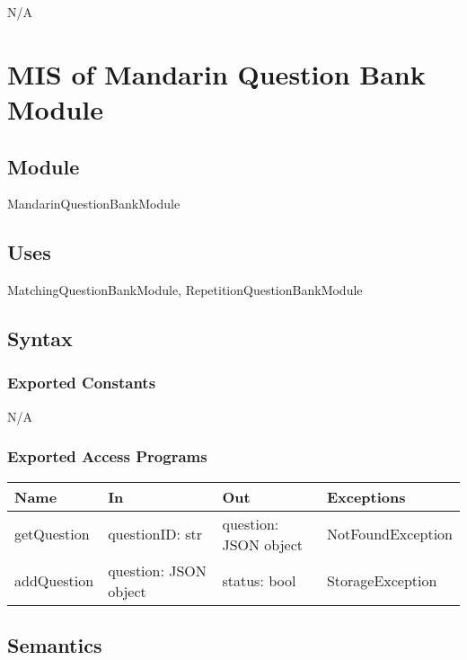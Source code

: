 \documentclass[12pt, titlepage]{article}
\begin{document}
N/A
\section{MIS of Mandarin Question Bank Module} \label{MandarinQuestionBankModule}

\subsection{Module}

MandarinQuestionBankModule

\subsection{Uses}

MatchingQuestionBankModule, RepetitionQuestionBankModule

\subsection{Syntax}

\subsubsection{Exported Constants}

N/A

\subsubsection{Exported Access Programs}

\begin{center}
\begin{tabular}{p{3cm} p{4cm} p{4cm} p{5cm}}
\hline
\textbf{Name} & \textbf{In} & \textbf{Out} & \textbf{Exceptions} \\
\hline
getQuestion & \raggedright\arraybackslash questionID: str & \raggedright\arraybackslash question: JSON object & \raggedright\arraybackslash NotFoundException \\
\hline
addQuestion & \raggedright\arraybackslash question: JSON object & \raggedright\arraybackslash status: bool & \raggedright\arraybackslash StorageException \\
\hline
\end{tabular}
\end{center}

\subsection{Semantics}
\end{document}
